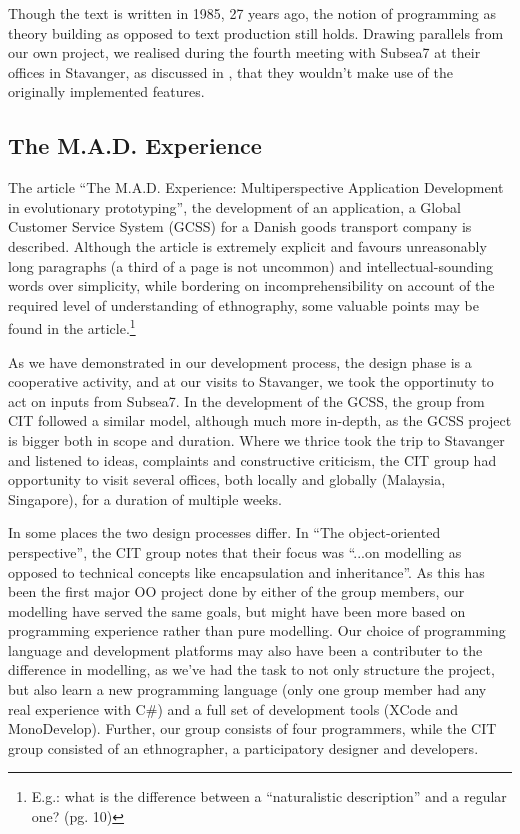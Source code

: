 Though the text is written in 1985, 27 years ago, the notion of
programming as theory building as opposed to text production still
holds. Drawing parallels from our own project, we realised during the
fourth meeting with Subsea7 at their offices in Stavanger, as
discussed in , that they wouldn't make use
of the originally implemented features.

\subsection{The M.A.D. Experience}

The article ``The M.A.D. Experience: Multiperspective Application
Development in evolutionary prototyping'', the development of an
application, a Global Customer Service System (GCSS) for a Danish
goods transport company is described. Although the article is
extremely explicit and favours unreasonably long paragraphs (a third
of a page is not uncommon) and intellectual-sounding words over
simplicity, while bordering on incomprehensibility on account of the
required level of understanding of ethnography, some valuable points
may be found in the article.\footnote{E.g.: what is the difference between a
  ``naturalistic description'' and a regular one?  (pg. 10)}

As we have demonstrated in our development process, the design phase is a
cooperative activity, and at our visits to Stavanger, we took the
opportinuty to act on inputs from Subsea7. In the development of the
GCSS, the group from CIT followed a similar model, although much more
in-depth, as the GCSS project is bigger both in scope and
duration. Where we thrice took the trip to Stavanger and listened to
ideas, complaints and constructive criticism, the CIT group had
opportunity to visit several offices, both locally and globally
(Malaysia, Singapore), for a duration of multiple weeks.

In some places the two design processes differ.
In ``The object-oriented perspective'', the CIT group notes that their
focus was ``...on modelling as opposed to technical concepts like
encapsulation and inheritance''. As this has been the first major OO
project done by either of the group members, our modelling have served
the same goals, but might have been more based on programming
experience rather than pure modelling. Our choice of programming
language and development platforms may also have been a contributer to
the difference in modelling, as we've had the task to not only
structure the project, but also learn a new programming language (only
one group member had any real experience with C\#) and a full set of
development tools (XCode and MonoDevelop). Further, our group consists
of four programmers, while the CIT group consisted of an ethnographer,
a participatory designer and developers.


